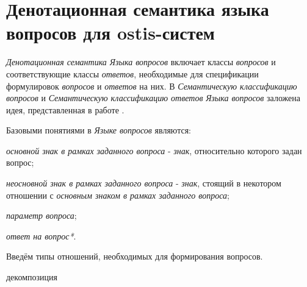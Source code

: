 \section{Денотационная семантика языка вопросов для ostis-систем}
\label{sec_requests_den_semantics}

\textit{Денотационная семантика Языка вопросов} включает классы \textit{вопросов} и соответствующие классы \textit{ответов}, необходимые для спецификации формулировок \textit{вопросов} и \textit{ответов} на них. В \textit{Семантическую классификацию вопросов} и \textit{Семантическую классификацию ответов} \textit{Языка вопросов} заложена идея, представленная в работе .

Базовыми понятиями в \textit{Языке вопросов} являются:
\begin{textitemize}
	\item \textit{основной знак в рамках заданного вопроса} - \textit{знак}, относительно которого задан вопрос;
	\item \textit{неосновной знак в рамках заданного вопроса} - \textit{знак}, стоящий в некотором отношении с \textit{основным знаком в рамках заданного вопроса};
    \item \textit{параметр вопроса\scnrolesign};
	\item \textit{ответ на вопрос*}.
\end{textitemize}

Введём типы отношений, необходимых для формирования вопросов.

\begin{SCn}
\end{SCn}

\begin{SCn}
\begin{scnrelfromset}{декомпозиция}
\end{scnrelfromset}
\end{SCn}

